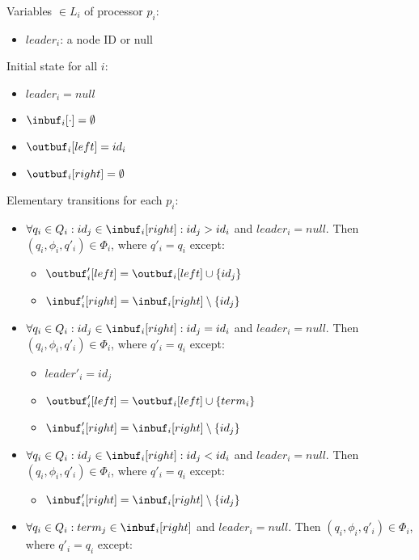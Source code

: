 Variables $\in L_i$ of processor $p_i$:
\begin{itemize}
\item $leader_i$: a node ID or null
\end{itemize}

Initial state for all $i$:
\begin{itemize}
\item $leader_i = null$
\item $\inbuf_i[\cdot] = \emptyset$
\item $\outbuf_i[left] = id_i$
\item $\outbuf_i[right] = \emptyset$
\end{itemize}

Elementary transitions for each $p_i$:
\begin{itemize}
\item $\forall q_i \in Q_i: id_j \in \inbuf_i[right]: id_j > id_i$ and $leader_i = null$.
      Then $(q_i, \phi_i, q'_i) \in \Phi_i$,
      where $q'_i = q_i$ except:
      \begin{itemize}
      \item $\outbuf'_i[left] = \outbuf_i[left] \cup \{id_j\}$
      \item $\inbuf'_i[right] = \inbuf_i[right] \setminus \{id_j\}$
      \end{itemize}
\item $\forall q_i \in Q_i: id_j \in \inbuf_i[right]: id_j = id_i$ and $leader_i = null$.
      Then $(q_i, \phi_i, q'_i) \in \Phi_i$,
      where $q'_i = q_i$ except:
      \begin{itemize}
      \item $leader'_i = id_j$
      \item $\outbuf'_i[left] = \outbuf_i[left] \cup \{term_i\}$
      \item $\inbuf'_i[right] = \inbuf_i[right] \setminus \{id_j\}$
      \end{itemize}
\item $\forall q_i \in Q_i: id_j \in \inbuf_i[right]: id_j < id_i$ and $leader_i = null$.
      Then $(q_i, \phi_i, q'_i) \in \Phi_i$,
      where $q'_i = q_i$ except:
      \begin{itemize}
      \item $\inbuf'_i[right] = \inbuf_i[right] \setminus \{id_j\}$
      \end{itemize}
\item $\forall q_i \in Q_i: term_j \in \inbuf_i[right]$ and $leader_i = null$.
      Then $(q_i, \phi_i, q'_i) \in \Phi_i$,
      where $q'_i = q_i$ except:

\end{itemize}
